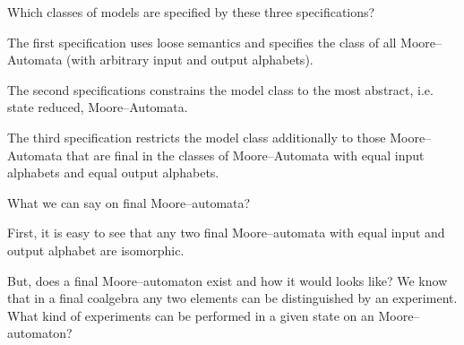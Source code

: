 \documentclass[landscape, autoslides, light]{mmiss}
\newcommand{\ns}{\normalsize}
\begin{document}
\begin{Package}[Label={FSDPT}, Title={Formal Specification of Data and Process Types}, ShortTitle={FSDPT}, Authors={Horst Reichel}, Date={February 2003}, LevelOfDetail=Lecture, Language=en-GB]
\begin{Section}[Title={Final Coalgebras as Process Types}, Label={section4}]
\begin{Section}[Title={Examples of Process Types}, Label={section4_2}]
\begin{Paragraph}[Title={Moore--Automata}, Label=Paragraph94]
\end{Paragraph}
\begin{Paragraph}[Title={Moore--Automata}, Label=Paragraph95]

Which classes of models are specified by these three
specifications?\pause

\vspace{8mm}

The first specification uses loose semantics and specifies the
class of all Moore--Automata (with arbitrary input and output
alphabets). \pause

\vspace{8mm}

 The second specifications constrains the model class to the most
abstract, i.e. state reduced, Moore--Automata. \pause

\vspace{8mm}

 The third specification restricts  the model class
additionally to those Moore--Automata that are final in the
classes of Moore--Automata with equal input alphabets and equal
output alphabets.

\end{Paragraph}
\begin{Paragraph}[Title={final Moore--automaton}, Label=Paragraph96]

\ns

 What we can say on final Moore--automata? \pause \vspace{8mm}

First, it is easy to see that any two final Moore--automata with
equal input and output alphabet are isomorphic. \pause
\vspace{8mm}

But, does a final Moore--automaton exist and how it would looks
like? We know that in a final coalgebra any two elements can be
distinguished by an experiment. What kind of experiments can be
performed in a given state on an Moore--automaton?


\end{Paragraph}
\end{Section}
\end{Section}
\end{Package}
\end{document}
